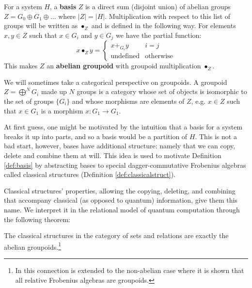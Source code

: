 \begin{defn}
\label{def:basis}
For a system $H$, a \textbf{basis} $Z$ is a direct sum (disjoint union) of abelian groups $Z = G_0\oplus G_1\oplus...$ where $|Z| = |H|$.
Multiplication with respect to this list of groups will be written as $\bullet_Z$ and is defined in the following way. For elements $x,y\in Z$ such that $x\in G_i$ and $y\in G_j$ we have the partial function:
\begin{equation}
\label{eq:groupoidmult}
x\bullet_Zy = \begin{cases}
x +_{G_i} y & i=j \\
\mbox{undefined} & \mbox{otherwise}
\end{cases}
\end{equation}
This makes $Z$ an \textbf{abelian groupoid} with groupoid multiplication $\bullet_Z$.
\end{defn}
We will sometimes take a categorical perspective on groupoids. A groupoid $Z=\bigoplus^NG_i$ made up $N$ groups is a category whose set of objects is isomorphic to the set of groups $\{G_i\}$ and whose morphisms are elements of $Z$, e.g. $x\in Z$ such that $x\in G_1$ is a morphism $x:G_1\to G_1$.

At first guess, one might be motivated by the intuition that a basis for a system breaks it up into parts, and so a basis would be a partition of $H$.  This is not a bad start, however, bases have additional structure: namely that we can copy, delete and combine them at will.  This idea is used to motivate Definition \ref{def:basis} by abstracting bases to special dagger-commutative Frobenius algebras called classical structures (Definition \ref{def:classicalstruct}).

Classical structures' properties, allowing the copying, deleting, and combining that accompany classical (as opposed to quantum) information, give them this name. We interpret it in the relational model of quantum computation through the following theorem:

\begin{lemma}
\label{lem:sdfa-rel}
The classical structures in the category of sets and relations are exactly the abelian groupoids.\footnote{In \cite{heunen-relFrob} this connection is extended to the non-abelian case where it is shown that all relative Frobenius algebras are groupoids.}
\end{lemma}

